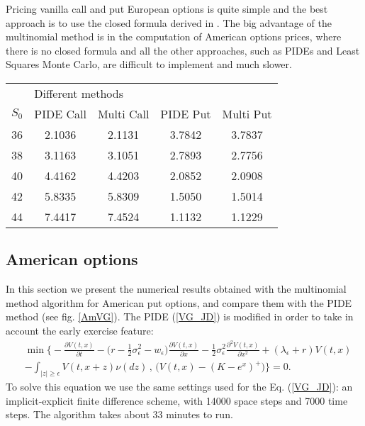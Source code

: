 \documentclass[]{interact}
\theoremstyle{plain}%
\theoremstyle{definition}
\theoremstyle{remark}
\begin{document}
Pricing vanilla call and put European options is quite simple and the best approach is to use the closed formula derived in \cite{MCC98}.
The big advantage of the multinomial method is in the computation of American options prices, where there is no closed formula and all the other approaches, 
such as PIDEs and Least Squares Monte Carlo, are difficult to implement and much slower.
\begin{table}[h!]
{\begin{tabular}{lcccc} \toprule
& \multicolumn{2}{l}{Different methods} \\ \cmidrule{2-5}
  $S_0$ & PIDE Call & Multi Call & PIDE Put & Multi Put \\ \midrule
  36 & 2.1036 & 2.1131 & 3.7842 & 3.7837  \\
  38 & 3.1163 & 3.1051 & 2.7893 & 2.7756 \\
  40 & 4.4162 & 4.4203 & 2.0852 & 2.0908 \\
  42 & 5.8335 & 5.8309 & 1.5050 & 1.5014 \\
  44 & 7.4417 & 7.4524 & 1.1132 & 1.1229 \\ \bottomrule
\end{tabular}}
\label{Option_values}
\end{table}



\subsection{American options}

In this section we present the numerical results obtained with the multinomial method algorithm for American put options, and compare them with the PIDE method (see fig. \ref{AmVG}).
The PIDE (\ref{VG_JD}) is modified in order to take in account the early exercise feature:
\begin{align}\label{VG_Am_JD}
&  \min \biggl\{ - \frac{\partial V(t,x)}{\partial t} -
 \bigl( r-\frac{1}{2}\sigma_{\epsilon}^2 - w_{\epsilon} \bigr) \frac{\partial V(t,x)}{\partial x} 
 - \frac{1}{2}\sigma_{\epsilon}^2 \frac{\partial^2 V(t,x)}{\partial x^2} + (\lambda_{\epsilon} + r) V(t,x) \\ \nonumber
 &- \int_{|z| \geq \epsilon} V(t,x+z) \nu(dz) \, , \, \biggl( V(t,x) - (K-e^x)^+ \biggr) \biggr\} = 0.
\end{align}
To solve this equation we use the same settings used for the Eq. (\ref{VG_JD}): an implicit-explicit finite difference scheme, with 14000 space steps and 7000 time steps. 
The algorithm takes about 33 minutes to run.
\end{document}

